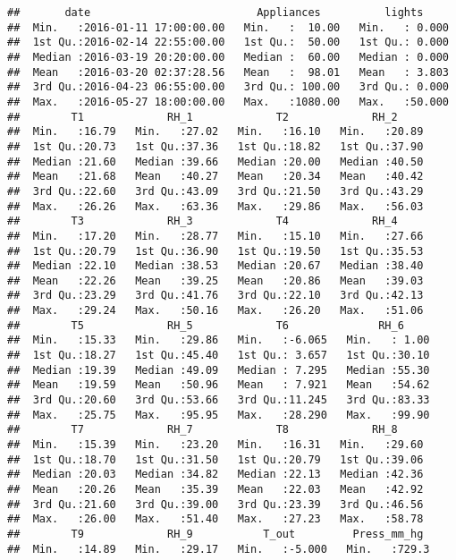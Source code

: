 \documentclass[
]{article}
\begin{document}
\begin{verbatim}
##       date                          Appliances          lights      
##  Min.   :2016-01-11 17:00:00.00   Min.   :  10.00   Min.   : 0.000  
##  1st Qu.:2016-02-14 22:55:00.00   1st Qu.:  50.00   1st Qu.: 0.000  
##  Median :2016-03-19 20:20:00.00   Median :  60.00   Median : 0.000  
##  Mean   :2016-03-20 02:37:28.56   Mean   :  98.01   Mean   : 3.803  
##  3rd Qu.:2016-04-23 06:55:00.00   3rd Qu.: 100.00   3rd Qu.: 0.000  
##  Max.   :2016-05-27 18:00:00.00   Max.   :1080.00   Max.   :50.000  
##        T1             RH_1             T2             RH_2      
##  Min.   :16.79   Min.   :27.02   Min.   :16.10   Min.   :20.89  
##  1st Qu.:20.73   1st Qu.:37.36   1st Qu.:18.82   1st Qu.:37.90  
##  Median :21.60   Median :39.66   Median :20.00   Median :40.50  
##  Mean   :21.68   Mean   :40.27   Mean   :20.34   Mean   :40.42  
##  3rd Qu.:22.60   3rd Qu.:43.09   3rd Qu.:21.50   3rd Qu.:43.29  
##  Max.   :26.26   Max.   :63.36   Max.   :29.86   Max.   :56.03  
##        T3             RH_3             T4             RH_4      
##  Min.   :17.20   Min.   :28.77   Min.   :15.10   Min.   :27.66  
##  1st Qu.:20.79   1st Qu.:36.90   1st Qu.:19.50   1st Qu.:35.53  
##  Median :22.10   Median :38.53   Median :20.67   Median :38.40  
##  Mean   :22.26   Mean   :39.25   Mean   :20.86   Mean   :39.03  
##  3rd Qu.:23.29   3rd Qu.:41.76   3rd Qu.:22.10   3rd Qu.:42.13  
##  Max.   :29.24   Max.   :50.16   Max.   :26.20   Max.   :51.06  
##        T5             RH_5             T6              RH_6      
##  Min.   :15.33   Min.   :29.86   Min.   :-6.065   Min.   : 1.00  
##  1st Qu.:18.27   1st Qu.:45.40   1st Qu.: 3.657   1st Qu.:30.10  
##  Median :19.39   Median :49.09   Median : 7.295   Median :55.30  
##  Mean   :19.59   Mean   :50.96   Mean   : 7.921   Mean   :54.62  
##  3rd Qu.:20.60   3rd Qu.:53.66   3rd Qu.:11.245   3rd Qu.:83.33  
##  Max.   :25.75   Max.   :95.95   Max.   :28.290   Max.   :99.90  
##        T7             RH_7             T8             RH_8      
##  Min.   :15.39   Min.   :23.20   Min.   :16.31   Min.   :29.60  
##  1st Qu.:18.70   1st Qu.:31.50   1st Qu.:20.79   1st Qu.:39.06  
##  Median :20.03   Median :34.82   Median :22.13   Median :42.36  
##  Mean   :20.26   Mean   :35.39   Mean   :22.03   Mean   :42.92  
##  3rd Qu.:21.60   3rd Qu.:39.00   3rd Qu.:23.39   3rd Qu.:46.56  
##  Max.   :26.00   Max.   :51.40   Max.   :27.23   Max.   :58.78  
##        T9             RH_9           T_out         Press_mm_hg   
##  Min.   :14.89   Min.   :29.17   Min.   :-5.000   Min.   :729.3  

\end{verbatim}
\end{document}
